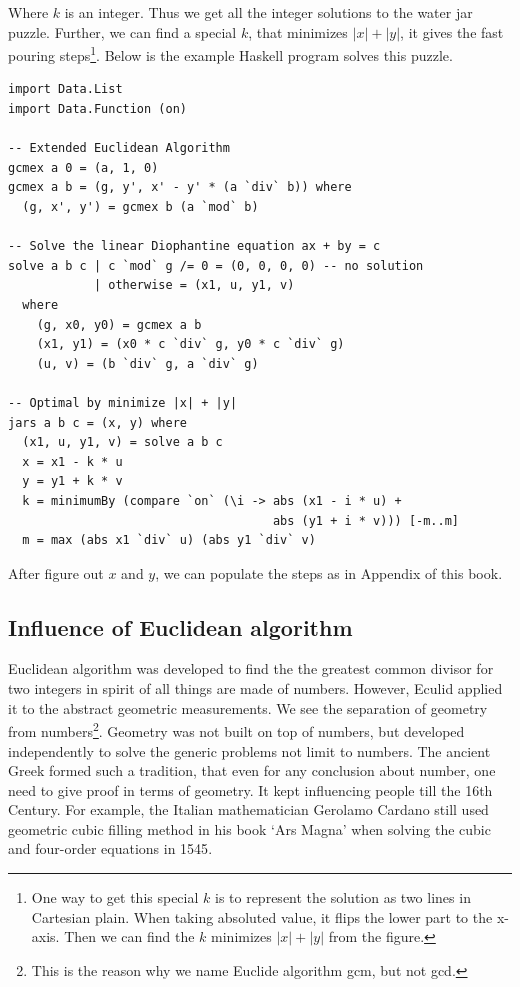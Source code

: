 \documentclass{article}
\begin{document}
Where $k$ is an integer. Thus we get all the integer solutions to the water jar puzzle. Further, we can find a special $k$, that minimizes $|x| + |y|$, it gives the fast pouring steps\footnote{One way to get this special $k$ is to represent the solution as two lines in Cartesian plain. When taking absoluted value, it flips the lower part to the x-axis. Then we can find the $k$ minimizes $|x| + |y|$ from the figure.}. Below is the example Haskell program solves this  puzzle.

\lstset{frame=single}
\begin{lstlisting}
import Data.List
import Data.Function (on)

-- Extended Euclidean Algorithm
gcmex a 0 = (a, 1, 0)
gcmex a b = (g, y', x' - y' * (a `div` b)) where
  (g, x', y') = gcmex b (a `mod` b)

-- Solve the linear Diophantine equation ax + by = c
solve a b c | c `mod` g /= 0 = (0, 0, 0, 0) -- no solution
            | otherwise = (x1, u, y1, v)
  where
    (g, x0, y0) = gcmex a b
    (x1, y1) = (x0 * c `div` g, y0 * c `div` g)
    (u, v) = (b `div` g, a `div` g)

-- Optimal by minimize |x| + |y|
jars a b c = (x, y) where
  (x1, u, y1, v) = solve a b c
  x = x1 - k * u
  y = y1 + k * v
  k = minimumBy (compare `on` (\i -> abs (x1 - i * u) +
                                     abs (y1 + i * v))) [-m..m]
  m = max (abs x1 `div` u) (abs y1 `div` v)
\end{lstlisting}

After figure out $x$ and $y$, we can populate the steps as in Appendix of this book.

\subsection{Influence of Euclidean algorithm}

Euclidean algorithm was developed to find the the greatest common divisor for two integers in spirit of all things are made of numbers. However, Eculid applied it to the abstract geometric measurements. We see the separation of geometry from numbers\footnote{This is the reason why we name Euclide algorithm gcm, but not gcd.}. Geometry was not built on top of numbers, but developed independently to solve the generic problems not limit to numbers. The ancient Greek formed such a tradition, that even for any conclusion about number, one need to give proof in terms of geometry. It kept influencing people till the 16th Century. For example, the Italian mathematician Gerolamo Cardano still used geometric cubic filling method in his book `Ars Magna' when solving the cubic and four-order equations in 1545\cite{HanXueTao2009}.
\end{document}
